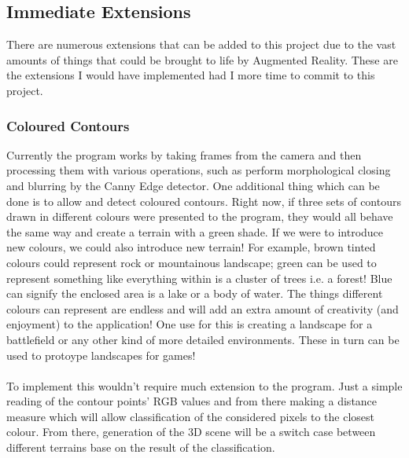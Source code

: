 \documentclass[11pt]{article}
\begin{document}
\subsection{Immediate Extensions}
There are numerous extensions that can be added to this project due to the 
vast amounts of things that could be brought to life by Augmented Reality.
These are the extensions I would have implemented had I more time to commit
to this project.

\subsubsection{Coloured Contours}
Currently the program works by taking frames from the camera and then   
processing them with various operations, such as perform morphological
closing and blurring by the Canny Edge detector. One additional thing 
which can be done is to allow and detect coloured contours. Right now,
if three sets of contours drawn in different colours were presented to
the program, they would all behave the same way and create a terrain
with a green shade. If we were to introduce new colours, we could also
introduce new terrain! For example, brown tinted colours could represent
rock or mountainous landscape; green can be used to represent something like
everything within is a cluster of trees i.e. a forest! Blue can signify
the enclosed area is a lake or a body of water. The things different
colours can represent are endless and will add an extra amount of creativity
(and enjoyment) to the application! One use for this is creating a 
landscape for a battlefield or any other kind of more detailed environments.
These in turn can be used to protoype landscapes for games!\\
\\
To implement this wouldn't require much extension to the program. Just a simple
reading of the contour points' RGB values and from there making a distance 
measure which will allow classification of the considered pixels to the 
closest colour. From there, generation of the 3D scene will be a switch case 
between different terrains base on the result of the classification.
\end{document}
